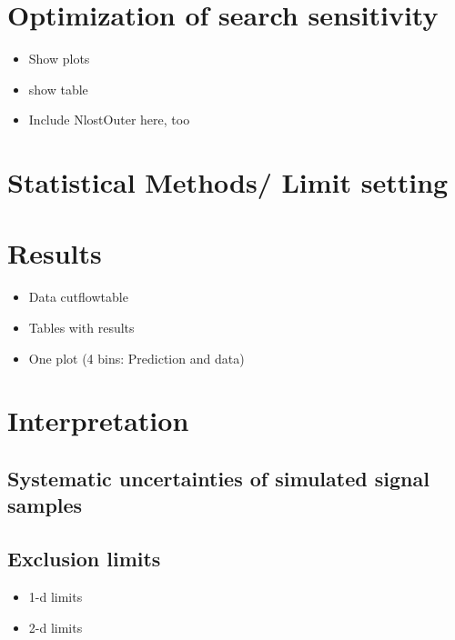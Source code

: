 \section{Optimization of search sensitivity}
\label{sec:Optimization}
\begin{itemize}
\item Show plots
\item show table
\item Include NlostOuter here, too
\end{itemize}

\section{Statistical Methods/ Limit setting}
\label{sec:LimitSetting}

\section{Results}
\label{sec:Results}
\begin{itemize}
\item Data cutflowtable
\item Tables with results
\item One plot (4 bins: Prediction and data)
\end{itemize}

\section{Interpretation}
\label{sec:Interpretation}
\subsection{Systematic uncertainties of simulated signal samples}
\subsection{Exclusion limits}
\begin{itemize}
\item 1-d limits
\item 2-d limits
\end{itemize}

